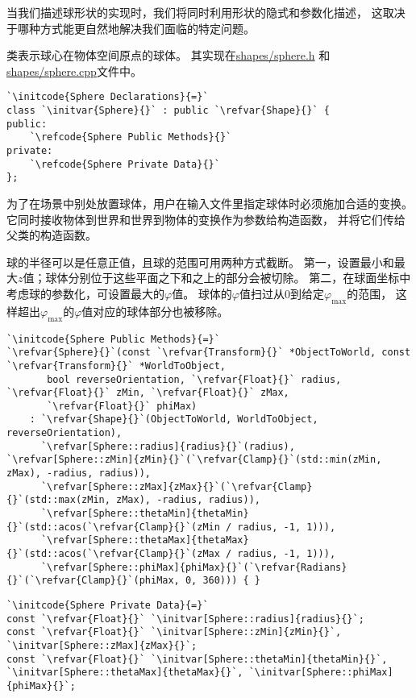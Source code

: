 当我们描述球形状的实现时，我们将同时利用形状的隐式和参数化描述，
这取决于哪种方式能更自然地解决我们面临的特定问题。

类表示球心在物体空间原点的球体。
其实现在\href{https://github.com/mmp/pbrt-v3/tree/master/src/shapes/sphere.h}{\ttfamily shapes/sphere.h}
和\href{https://github.com/mmp/pbrt-v3/tree/master/src/shapes/sphere.cpp}{\ttfamily shapes/sphere.cpp}文件中。
\begin{lstlisting}
`\initcode{Sphere Declarations}{=}`
class `\initvar{Sphere}{}` : public `\refvar{Shape}{}` {
public:
    `\refcode{Sphere Public Methods}{}`
private:
    `\refcode{Sphere Private Data}{}`
};
\end{lstlisting}

为了在场景中别处放置球体，用户在输入文件里指定球体时必须施加合适的变换。
它同时接收物体到世界和世界到物体的变换作为参数给构造函数，
并将它们传给父类的构造函数。

球的半径可以是任意正值，且球的范围可用两种方式截断。
第一，设置最小和最大$z$值；球体分别位于这些平面之下和之上的部分会被切除。
第二，在球面坐标中考虑球的参数化，可设置最大的$\varphi$值。
球体的$\varphi$值扫过从$0$到给定$\varphi_{\max}$的范围，
这样超出$\varphi_{\max}$的$\varphi$值对应的球体部分也被移除。
\begin{lstlisting}
`\initcode{Sphere Public Methods}{=}`
`\refvar{Sphere}{}`(const `\refvar{Transform}{}` *ObjectToWorld, const `\refvar{Transform}{}` *WorldToObject,
       bool reverseOrientation, `\refvar{Float}{}` radius, `\refvar{Float}{}` zMin, `\refvar{Float}{}` zMax,
       `\refvar{Float}{}` phiMax)
    : `\refvar{Shape}{}`(ObjectToWorld, WorldToObject, reverseOrientation),
      `\refvar[Sphere::radius]{radius}{}`(radius), `\refvar[Sphere::zMin]{zMin}{}`(`\refvar{Clamp}{}`(std::min(zMin, zMax), -radius, radius)),
      `\refvar[Sphere::zMax]{zMax}{}`(`\refvar{Clamp}{}`(std::max(zMin, zMax), -radius, radius)),
      `\refvar[Sphere::thetaMin]{thetaMin}{}`(std::acos(`\refvar{Clamp}{}`(zMin / radius, -1, 1))),
      `\refvar[Sphere::thetaMax]{thetaMax}{}`(std::acos(`\refvar{Clamp}{}`(zMax / radius, -1, 1))),
      `\refvar[Sphere::phiMax]{phiMax}{}`(`\refvar{Radians}{}`(`\refvar{Clamp}{}`(phiMax, 0, 360))) { }
\end{lstlisting}
\begin{lstlisting}
`\initcode{Sphere Private Data}{=}`
const `\refvar{Float}{}` `\initvar[Sphere::radius]{radius}{}`;
const `\refvar{Float}{}` `\initvar[Sphere::zMin]{zMin}{}`, `\initvar[Sphere::zMax]{zMax}{}`;
const `\refvar{Float}{}` `\initvar[Sphere::thetaMin]{thetaMin}{}`, `\initvar[Sphere::thetaMax]{thetaMax}{}`, `\initvar[Sphere::phiMax]{phiMax}{}`;
\end{lstlisting}

